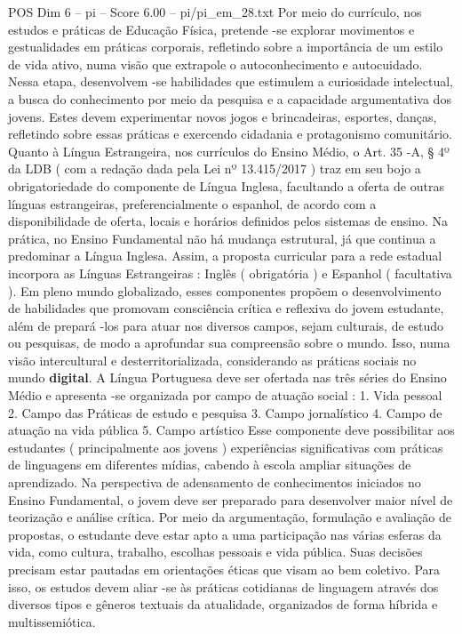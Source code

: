 \begin{textsample}{POS Dim 6 – pi – Score 6.00 – pi/pi\_em\_28.txt}
Por meio do currículo, nos estudos e práticas de Educação Física, pretende -se explorar movimentos e gestualidades em práticas corporais, refletindo sobre a importância de um estilo de vida ativo, numa visão que extrapole o autoconhecimento e autocuidado.
Nessa etapa, desenvolvem -se habilidades que estimulem a curiosidade intelectual, a busca do conhecimento por meio da pesquisa e a capacidade argumentativa dos jovens.
Estes devem experimentar novos jogos e brincadeiras, esportes, danças, refletindo sobre essas práticas e exercendo cidadania e protagonismo comunitário.
Quanto à Língua Estrangeira, nos currículos do Ensino Médio, o Art. 35 -A, § 4º da LDB ( com a redação dada pela Lei nº 13.415/2017 ) traz em seu bojo a obrigatoriedade do componente de Língua Inglesa, facultando a oferta de outras línguas estrangeiras, preferencialmente o espanhol, de acordo com a disponibilidade de oferta, locais e horários definidos pelos sistemas de ensino.
Na prática, no Ensino Fundamental não há mudança estrutural, já que continua a predominar a Língua Inglesa.
Assim, a proposta curricular para a rede estadual incorpora as Línguas Estrangeiras : Inglês ( obrigatória ) e Espanhol ( facultativa ).
Em pleno mundo globalizado, esses componentes propõem o desenvolvimento de habilidades que promovam consciência crítica e reflexiva do jovem estudante, além de prepará -los para atuar nos diversos campos, sejam culturais, de estudo ou pesquisas, de modo a aprofundar sua compreensão sobre o mundo.
Isso, numa visão intercultural e desterritorializada, considerando as práticas sociais no mundo \textbf{digital}.
A Língua Portuguesa deve ser ofertada nas três séries do Ensino Médio e apresenta -se organizada por campo de atuação social : 1.
Vida pessoal 2.
Campo das Práticas de estudo e pesquisa 3.
Campo jornalístico 4.
Campo de atuação na vida pública 5.
Campo artístico Esse componente deve possibilitar aos estudantes ( principalmente aos jovens ) experiências significativas com práticas de linguagens em diferentes mídias, cabendo à escola ampliar situações de aprendizado.
Na perspectiva de adensamento de conhecimentos iniciados no Ensino Fundamental, o jovem deve ser preparado para desenvolver maior nível de teorização e análise crítica.
Por meio da argumentação, formulação e avaliação de propostas, o estudante deve estar apto a uma participação nas várias esferas da vida, como cultura, trabalho, escolhas pessoais e vida pública.
Suas decisões precisam estar pautadas em orientações éticas que visam ao bem coletivo.
Para isso, os estudos devem aliar -se às práticas cotidianas de linguagem através dos diversos tipos e gêneros textuais da atualidade, organizados de forma híbrida e multissemiótica.

\end{textsample}
